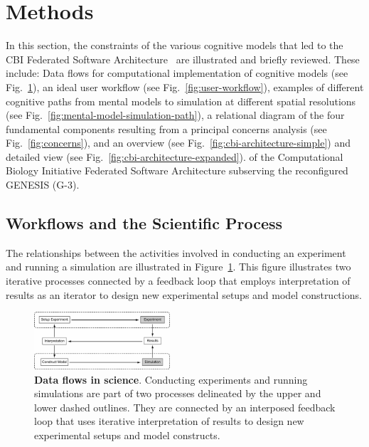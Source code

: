\documentclass[11pt,3p,twocolumn]{JMN}
\begin{document}


\section{Methods}

In this section, the constraints of the various cognitive models that led to the CBI Federated Software Architecture~\citep[for details, see][]{cornelis12,cornelis08:_cbi_archit_comput_simul_realis} are illustrated and briefly reviewed. These include: Data flows for computational implementation of cognitive models (see Fig.~\ref{fig:exp-sim}), an ideal user workflow (see Fig.~\ref{fig:user-workflow}), examples of different cognitive paths from mental models to simulation at different spatial resolutions (see Fig.~\ref{fig:mental-model-simulation-path}), a relational diagram of the four fundamental components resulting from a principal concerns analysis (see Fig.~\ref{fig:concerns}), and an overview (see Fig.~\ref{fig:cbi-architecture-simple}) and detailed view (see Fig.~\ref{fig:cbi-architecture-expanded}). of the Computational Biology Initiative Federated Software Architecture subserving the reconfigured GENESIS (G-3).

\subsection{Workflows and the Scientific Process}

The relationships between the activities involved in conducting an experiment and running a simulation are illustrated in Figure~\ref{fig:exp-sim}. This figure illustrates two iterative processes connected by a feedback loop that employs interpretation of results as an iterator to design new experimental setups and model constructions.

\begin{figure}[h!t]
  \begin{center}
    \includegraphics[width=0.45\textwidth]{figures/exp-sim.pdf}
  \end{center}
  \caption{ \small{\textbf{Data flows in science}. Conducting experiments and running simulations are part of two processes delineated by the upper and lower dashed outlines. They are connected by an interposed feedback loop that uses iterative interpretation of results to design new experimental setups and model constructs.}}
    \label{fig:exp-sim}
\end{figure}
\end{document}
